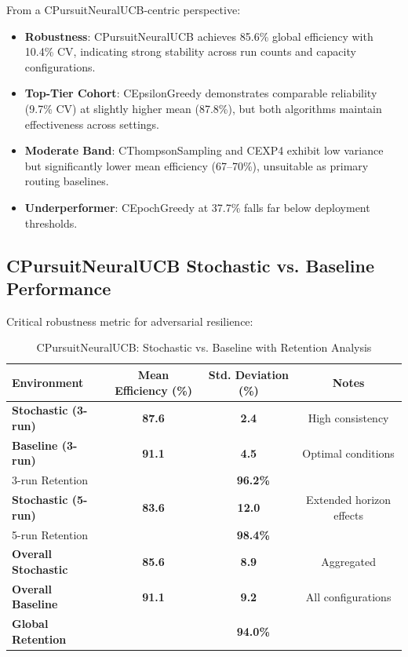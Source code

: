 \documentclass[12pt,a4paper]{article}
\newcommand{\secondarytext}[1]{\textcolor{secondaryblue}{\textbf{#1}}}
\newcommand{\success}[1]{\textcolor{accentgreen}{\textbf{#1}}}
\newcommand{\warning}[1]{\textcolor{warningred}{\textbf{#1}}}
\begin{document}
From a CPursuitNeuralUCB-centric perspective:

\begin{itemize}
    \item \success{Robustness}: CPursuitNeuralUCB achieves 85.6\% global efficiency with 10.4\% CV, indicating strong stability across run counts and capacity configurations.
    \item \secondarytext{Top-Tier Cohort}: CEpsilonGreedy demonstrates comparable reliability (9.7\% CV) at slightly higher mean (87.8\%), but both algorithms maintain effectiveness across settings.
    \item \warning{Moderate Band}: CThompsonSampling and CEXP4 exhibit low variance but significantly lower mean efficiency (67–70\%), unsuitable as primary routing baselines.
    \item \warning{Underperformer}: CEpochGreedy at 37.7\% falls far below deployment thresholds.
\end{itemize}

\subsection{CPursuitNeuralUCB Stochastic vs. Baseline Performance}

Critical robustness metric for adversarial resilience:

\begin{table}[H]
\centering
\caption{CPursuitNeuralUCB: Stochastic vs. Baseline with Retention Analysis}
\begin{tabular}{@{}lccc@{}}
\toprule
\textbf{Environment} & \textbf{Mean Efficiency (\%)} & \textbf{Std. Deviation (\%)} & \textbf{Notes} \\
\midrule
\success{Stochastic (3-run)} & \success{87.6} & \success{2.4} & High consistency \\
\success{Baseline (3-run)} & \success{91.1} & \success{4.5} & Optimal conditions \\
3-run Retention & \multicolumn{3}{c}{\success{96.2\%}} \\
\midrule
\success{Stochastic (5-run)} & \success{83.6} & \success{12.0} & Extended horizon effects \\
5-run Retention & \multicolumn{3}{c}{\success{98.4\%}} \\
\midrule
\success{Overall Stochastic} & \success{85.6} & \success{8.9} & Aggregated \\
\success{Overall Baseline} & \success{91.1} & \success{9.2} & All configurations \\
\textbf{Global Retention} & \multicolumn{3}{c}{\success{\textbf{94.0\%}}} \\
\bottomrule
\end{tabular}
\end{table}
\end{document}
